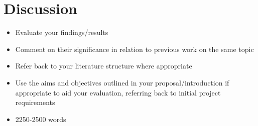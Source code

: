 \section{Discussion}

\begin{itemize}
    \item Evaluate your findings/results
    \item Comment on their significance in relation to previous work on the same topic
    \item Refer back to your literature structure where appropriate
    \item Use the aims and objectives outlined in your proposal/introduction if appropriate to aid your evaluation, referring back to initial project requirements
    \item 2250-2500 words
\end{itemize}